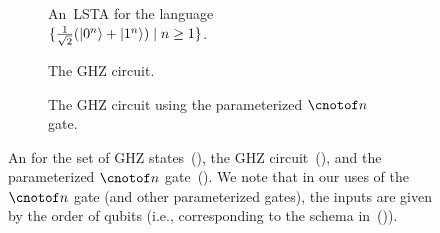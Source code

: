 {\begin{figure}[t]
\begin{minipage}[b]{0.35\textwidth}
\begin{subfigure}{\textwidth}
{{  
}}
\caption{An~LSTA for the language \\$\{\frac 1 {\sqrt 2}(\ket{0^{n}} + \ket{1^{n}}) \mid n \geq 1\}$.}\label{fig:H0n}
\end{subfigure}
  \end{minipage}
 \hfill
 \begin{subfigure}[b]{0.25\textwidth}
\hspace*{-10mm}
\caption{The GHZ circuit.} \label{fig:GHZcircuit}
\end{subfigure}
\hfill
\begin{subfigure}[b]{0.3\linewidth}
\caption{The GHZ circuit using the parameterized $\cnotof n$ gate.}
\label{fig:paramCNOT}
\end{subfigure}
\vspace{-2mm}
\caption{
  An \lsta for the set of GHZ states~(), the GHZ
  circuit~(), and the parameterized $\cnotof n$
  gate~().
  We note that in our uses of the $\cnotof n$ gate (and other parameterized
  gates), the inputs are given by the order of qubits (i.e., corresponding to the
  schema in~()).
}
\vspace*{-3mm}
\end{figure}
}

